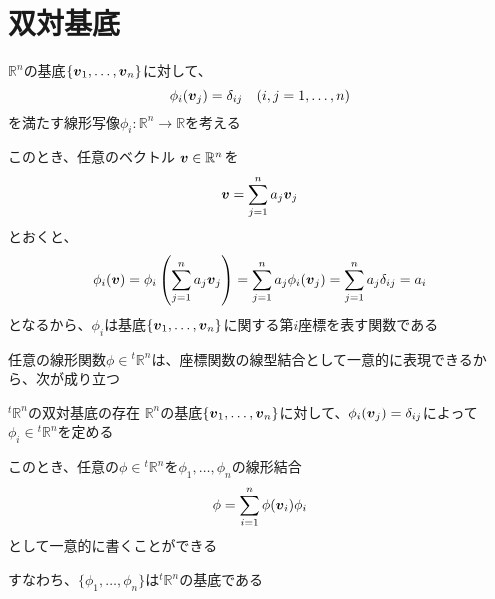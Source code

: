 \documentclass[../../../topic_linear-algebra]{subfiles}
\begin{document}
\sectionline
\section{双対基底}

$\mathbb{R}^n$の基底$\{ \vb*{v}_1,\ldots,\vb*{v}_n \}$に対して、
\begin{equation*}
  \phi_i(\vb*{v}_j) = \delta_{ij} \quad (i,j=1,\ldots,n)
\end{equation*}
を満たす線形写像$\phi_i:\mathbb{R}^n \to \mathbb{R}$を考える

\br

このとき、任意のベクトル $\vb*{v} \in \mathbb{R}^n$を
\begin{equation*}
  \vb*{v} = \sum_{j=1}^n a_j \vb*{v}_j
\end{equation*}
とおくと、
\begin{equation*}
  \phi_i(\vb*{v}) = \phi_i\left(\sum_{j=1}^{n} a_j \vb*{v}_j\right) = \sum_{j=1}^{n} a_j \phi_i(\vb*{v}_j) = \sum_{j=1}^{n} a_j \delta_{ij} = a_i
\end{equation*}
となるから、$\phi_i$は基底$\{ \vb*{v}_1,\ldots,\vb*{v}_n \}$に関する第$i$座標を表す関数である

\br

任意の線形関数$\phi \in {}^t\mathbb{R}^n$は、座標関数の線型結合として一意的に表現できるから、次が成り立つ

\begin{theorem}{${}^t\mathbb{R}^n$の双対基底の存在}
  $\mathbb{R}^n$の基底$\{ \vb*{v}_1,\ldots,\vb*{v}_n \}$に対して、$\phi_i(\vb*{v}_j) = \delta_{ij}$によって$\phi_i \in {}^t\mathbb{R}^n$を定める

  このとき、任意の$\phi \in {}^t\mathbb{R}^n$を$\phi_1,\ldots,\phi_n$の線形結合
  \begin{equation*}
    \phi = \sum_{i=1}^{n} \phi(\vb*{v}_i) \phi_i
  \end{equation*}
  として一意的に書くことができる

  すなわち、$\{ \phi_1,\ldots,\phi_n \}$は${}^t \mathbb{R}^n$の基底である
\end{theorem}
\end{document}
